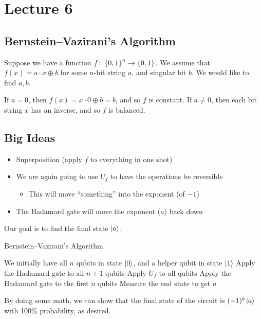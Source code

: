 \documentclass[class=article, crop=false]{standalone}
\begin{document}
  \section{Lecture 6}
  \subsection{Bernstein--Vazirani's Algorithm}
  Suppose we have a function $f\colon \left\{0, 1\right\}^n\to \left\{0, 1\right\}$. We assume that $f(x) = a\cdot x\oplus b$ for some $n$-bit string $a$, and singular bit $b$. We would like to find $a, b$. \par
  \begin{note}{}
    If $a = 0$, then $f(x) = x\cdot 0\oplus b = b$, and so $f$ is constant. If $a\neq 0$, then each bit string $x$ has an inverse, and so $f$ is balanced.
  \end{note}
  \subsection{Big Ideas}
  \begin{itemize}
    \item Superposition (apply $f$ to everything in one shot)
    \item We are again going to use $U_f$ to have the operations be reversible
    \begin{itemize}
      \item This will move ``something'' into the exponent (of $-1$)
    \end{itemize}
    \item The Hadamard gate will move the exponent ($a$) back down
  \end{itemize}
  Our goal is to find the final state $\left\lvert a \right\rangle$. \par
  \begin{algorithm}
    \DontPrintSemicolon
    \caption{Bernstein--Vazirani's Algorithm}
    We initially have all $n$ qubits in state $\left\lvert 0 \right\rangle$, and a helper qubit in state $\left\lvert 1 \right\rangle$\;
    Apply the Hadamard gate to all $n + 1$ qubits\;
    Apply $U_f$ to all qubits\;
    Apply the Hadamard gate to the first $n$ qubits\;
    Measure the end state to get $a$\;
  \end{algorithm}
  By doing some math, we can show that the final state of the circuit is $(-1)^{b}\left\lvert a \right\rangle$ with 100\% probability, as desired.
\end{document}
